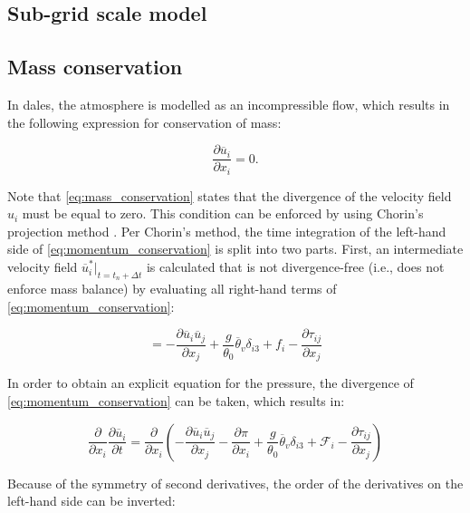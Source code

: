 \subsection{Sub-grid scale model}


\subsection{Mass conservation} \label{sec:dales_poisson}
In \acrshort{dales}, the atmosphere is modelled as an incompressible flow, which results in the following expression for conservation of mass:

\begin{equation}
    \frac{\partial \overline{u}_i}{\partial x_i} = 0. \label{eq:mass_conservation}
\end{equation}

Note that \autoref{eq:mass_conservation} states that the divergence of the velocity field $u_i$ must be equal to zero. This condition can be enforced by using Chorin's projection method \citep{chorinNumericalSolutionNavierStokes1967}. Per Chorin's method, the time integration of the left-hand side of \autoref{eq:momentum_conservation} is split into two parts. First, an intermediate velocity field $\overline{u}^*_i |_{t=t_n + \Delta t}$ is calculated that is not divergence-free (i.e., does not enforce mass balance) by evaluating all right-hand terms of \autoref{eq:momentum_conservation}: 

\begin{equation}
     = - \frac{\partial \overline{u}_i \overline{u}_j}{\partial x_j} + \frac{g}{\theta_0}\overline{\theta}_v \delta_{i3} + f_i - \frac{\partial \tau_{ij}}{\partial x_j} \label{eq:chorin_step1}
\end{equation}

In order to obtain an explicit equation for the pressure, the divergence of \autoref{eq:momentum_conservation} can be taken, which results in:

\begin{equation}
    \frac{\partial}{\partial x_i}\frac{\partial \overline{u}_i}{\partial t} = \frac{\partial}{\partial x_i} \left( - \frac{\partial \overline{u}_i \overline{u}_j}{\partial x_j} - \frac{\partial \pi}{\partial x_i} + \frac{g}{\theta_0}\overline{\theta}_v \delta_{i3} + \mathcal{F}_i - \frac{\partial \tau_{ij}}{\partial x_j} \right) \label{eq:momentum_divergence}
\end{equation}

\noindent Because of the symmetry of second derivatives, the order of the derivatives on the left-hand side can be inverted:

